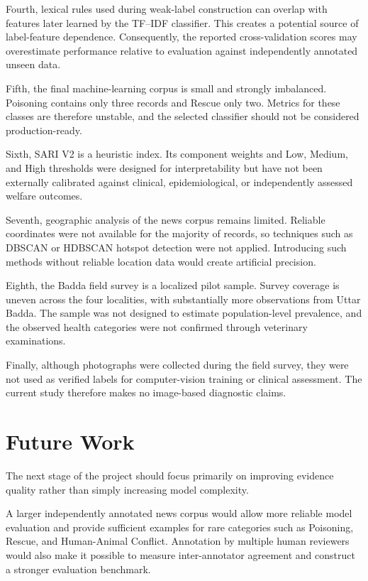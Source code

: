 \documentclass[conference]{IEEEtran}
\begin{document}
Fourth, lexical rules used during weak-label construction can overlap with
features later learned by the TF--IDF classifier. This creates a potential
source of label-feature dependence. Consequently, the reported
cross-validation scores may overestimate performance relative to evaluation
against independently annotated unseen data.

Fifth, the final machine-learning corpus is small and strongly imbalanced.
Poisoning contains only three records and Rescue only two. Metrics for these
classes are therefore unstable, and the selected classifier should not be
considered production-ready.

Sixth, SARI V2 is a heuristic index. Its component weights and Low, Medium,
and High thresholds were designed for interpretability but have not been
externally calibrated against clinical, epidemiological, or independently
assessed welfare outcomes.

Seventh, geographic analysis of the news corpus remains limited. Reliable
coordinates were not available for the majority of records, so techniques
such as DBSCAN or HDBSCAN hotspot detection were not applied. Introducing
such methods without reliable location data would create artificial
precision.

Eighth, the Badda field survey is a localized pilot sample. Survey coverage
is uneven across the four localities, with substantially more observations
from Uttar Badda. The sample was not designed to estimate population-level
prevalence, and the observed health categories were not confirmed through
veterinary examinations.

Finally, although photographs were collected during the field survey, they
were not used as verified labels for computer-vision training or clinical
assessment. The current study therefore makes no image-based diagnostic
claims.


\section{Future Work}

The next stage of the project should focus primarily on improving evidence
quality rather than simply increasing model complexity.

A larger independently annotated news corpus would allow more reliable model
evaluation and provide sufficient examples for rare categories such as
Poisoning, Rescue, and Human-Animal Conflict. Annotation by multiple human
reviewers would also make it possible to measure inter-annotator agreement
and construct a stronger evaluation benchmark.
\end{document}
